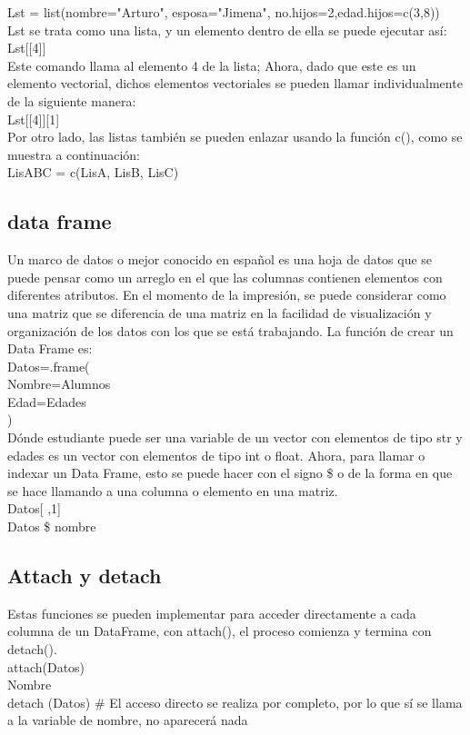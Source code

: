 \documentclass{article}
\begin{document}
Lst = list(nombre="Arturo", esposa="Jimena", no.hijos=2,edad.hijos=c(3,8))\\

Lst se trata como una lista, y un elemento dentro de ella se puede ejecutar así:\\
Lst[[4]]\\

Este comando llama al elemento 4 de la lista; Ahora, dado que este es un elemento vectorial, dichos elementos vectoriales se pueden llamar individualmente de la siguiente manera:\\
Lst[[4]][1]\\

Por otro lado, las listas también se pueden enlazar usando la función c(), como se muestra a continuación:\\
LisABC = c(LisA, LisB, LisC)\\
\subsection{data frame}
Un marco de datos o mejor conocido en español es una hoja de datos que se puede pensar como un arreglo en el que las columnas contienen elementos con diferentes atributos. En el momento de la impresión, se puede considerar como una matriz que se diferencia de una matriz en la facilidad de visualización y organización de los datos con los que se está trabajando. La función de crear un Data Frame es:\\

Datos=.frame(\\
	Nombre=Alumnos\\
	Edad=Edades\\
)\\

Dónde estudiante puede ser una variable de un vector con elementos de tipo str y edades es un vector con elementos de tipo int o float. Ahora, para llamar o indexar un Data Frame, esto se puede hacer con el signo \$ o de la forma en que se hace llamando a una columna o elemento en una matriz.\\

Datos[ ,1]\\
Datos \$ nombre 
\subsection{Attach y detach}
Estas funciones se pueden implementar para acceder
directamente a cada columna de un DataFrame, con attach(),
el proceso comienza y termina con detach().\\
attach(Datos)\\
Nombre\\
detach (Datos) \# El acceso directo se realiza por completo, por lo que sí se llama a la variable de nombre, no aparecerá nada\\
\end{document}
